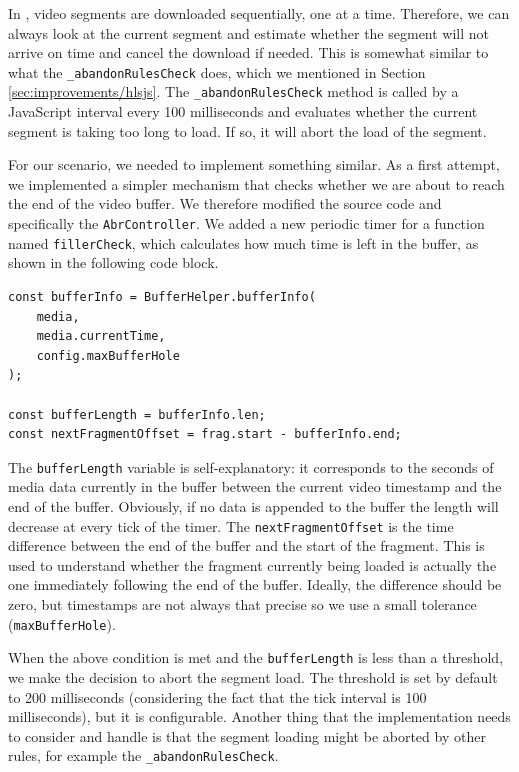 In \hlsjs{}, video segments are downloaded sequentially, one at a time. Therefore, we can always look at the current segment and estimate whether the segment will not arrive on time and cancel the download if needed. This is somewhat similar to what the \texttt{\_abandonRulesCheck} does, which we mentioned in Section \ref{sec:improvements/hlsjs}. The \texttt{\_abandonRulesCheck} method is called by a JavaScript interval every 100 milliseconds and evaluates whether the current segment is taking too long to load. If so, it will abort the load of the segment.

For our scenario, we needed to implement something similar. As a first attempt, we implemented a simpler mechanism that checks whether we are about to reach the end of the video buffer. We therefore modified the \hlsjs{} source code and specifically the \texttt{AbrController}. We added a new periodic timer for a function named \texttt{fillerCheck}, which calculates how much time is left in the buffer, as shown in the following code block.

\begin{verbatim}
const bufferInfo = BufferHelper.bufferInfo(
    media,
    media.currentTime,
    config.maxBufferHole
);

const bufferLength = bufferInfo.len;
const nextFragmentOffset = frag.start - bufferInfo.end;
\end{verbatim}

The \texttt{bufferLength} variable is self-explanatory: it corresponds to the seconds of media data currently in the buffer between the current video timestamp and the end of the buffer. Obviously, if no data is appended to the buffer the length will decrease at every tick of the timer. The \texttt{nextFragmentOffset} is the time difference between the end of the buffer and the start of the fragment. This is used to understand whether the fragment currently being loaded is actually the one immediately following the end of the buffer. Ideally, the difference should be zero, but timestamps are not always that precise so we use a small tolerance (\texttt{maxBufferHole}).

When the above condition is met and the \texttt{bufferLength} is less than a threshold, we make the decision to abort the segment load. The threshold is set by default to 200 milliseconds (considering the fact that the tick interval is 100 milliseconds), but it is configurable. Another thing that the implementation needs to consider and handle is that the segment loading might be aborted by other rules, for example the \texttt{\_abandonRulesCheck}.

